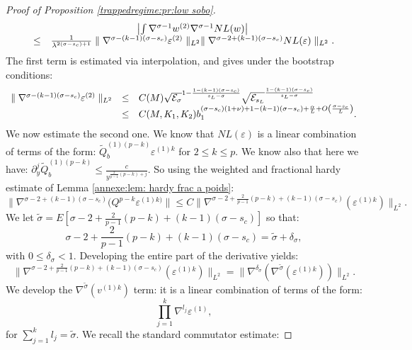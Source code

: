\documentclass[11pt,a4paper,reqno]{amsart}
\theoremstyle{remark}
\numberwithin{equation}{section}
\begin{document}
\begin{proof}[Proof of Proposition \ref{trappedregime:pr:low sobo}]
\begin{equation} \label{thetrapped:lowsobo:eq:expression NL}
\begin{array}{r c l}
&\left| \int \nabla^{\sigma-1} w^{(2)}\nabla^{\sigma -1}NL(w)\right| \\
\leq&  \frac{1}{\lambda^{2(\sigma-s_c)+1}} \parallel \nabla^{\sigma-(k-1)(\sigma-s_c)}\varepsilon^{(2)} \parallel_{L^2} \parallel \nabla^{\sigma-2+(k-1)(\sigma-s_c)} NL(\varepsilon) \parallel_{L^2} .
\end{array}
\end{equation}
The first term is estimated via interpolation, and gives under the bootstrap conditions:
\begin{equation} \label{thetrapped:lowsobo:eq:estimation NL 1}
\begin{array} {r c l}
\parallel \nabla^{\sigma-(k-1)(\sigma-s_c)} \varepsilon^{(2)}\parallel_{L^2} &\leq& C(M)\sqrt{\mathcal{E}_{\sigma}}^{1-\frac{1-(k-1)(\sigma-s_c)}{s_L-\sigma}} \sqrt{\mathcal{E}_{s_L}}^{\frac{1-(k-1)(\sigma-s_c)}{s_L-\sigma}}\\
&\leq& C(M,K_1,K_2) b_1^{(\sigma-s_c)(1+\nu)+1-(k-1)(\sigma-s_c)+\frac{\alpha}{L}+O\left( \frac{\sigma-s_c}{L}\right)} .
\end{array}
\end{equation}
We now estimate the second one. We know that $NL(\varepsilon)$ is a linear combination of terms of the form: $\tilde{Q}_b^{(1)(p-k)}\varepsilon^{(1)k}$ for $2\leq k\leq p$. We know also that here we have: $\partial_y^j\tilde{Q}_b^{(1)(p-k)}\leq\frac{c}{y^{\frac{2}{p-1}(p-k)+j}} $. So using the weighted and fractional hardy estimate of Lemma \ref{annexe:lem: hardy frac a poids}:
$$
\parallel \nabla^{\sigma-2+(k-1)(\sigma-s_c)}(Q^{p-k}\varepsilon^{(1)k)} \parallel \leq C \parallel \nabla^{\sigma-2+\frac{2}{p-1}(p-k)+(k-1)(\sigma-s_c)}(\varepsilon^{(1)k}) \parallel_{L^2} .
$$
We let $\tilde{\sigma}=E[\sigma-2+\frac{2}{p-1}(p-k)+(k-1)(\sigma-s_c)]$ so that:
$$
\sigma-2+\frac{2}{p-1}(p-k)+(k-1)(\sigma-s_c)=\tilde{\sigma}+\delta_{\sigma} ,
$$
with $0\leq \delta_{\sigma}<1$. Developing the entire part of the derivative yields:
$$
\parallel \nabla^{\sigma-2+\frac{2}{p-1}(p-k)+(k-1)(\sigma-s_c)}(\varepsilon^{(1)k}) \parallel_{L^2}=\parallel \nabla^{\delta_{\sigma}}(\nabla^{\tilde{\sigma}}(\varepsilon^{(1)k})) \parallel_{L^2} .
$$
We develop the $\nabla^{\tilde{\sigma}}(v^{(1)k})$ term: it is a linear combination of terms of the form:
$$
\prod_{j=1}^k \nabla^{l_j}\varepsilon^{(1)} ,
$$
for $\sum_{j=1}^k l_j=\tilde{\sigma}$. We recall the standard commutator estimate:

\end{proof}
\end{document}
